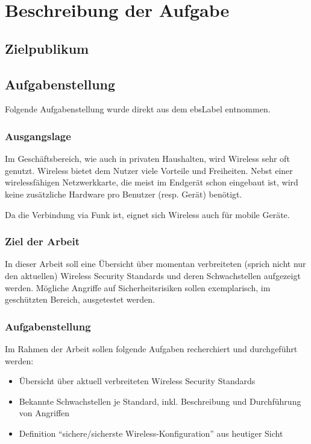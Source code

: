 \chapter{Beschreibung der Aufgabe}

\section{Zielpublikum}

\section{Aufgabenstellung}
Folgende Aufgabenstellung wurde direkt aus dem \gls{ebsLabel} entnommen.

\subsection{Ausgangslage}
Im Geschäftsbereich, wie auch in privaten Haushalten, wird Wireless sehr oft genutzt.
Wireless bietet dem Nutzer viele Vorteile und Freiheiten. Nebst einer wirelessfähigen Netzwerkkarte, die meist im Endgerät schon eingebaut ist, wird keine zusätzliche Hardware pro Benutzer (resp. Gerät) benötigt.

Da die Verbindung via Funk ist, eignet sich Wireless auch für mobile Geräte.

\subsection{Ziel der Arbeit}
In dieser Arbeit soll eine Übersicht über momentan verbreiteten (sprich nicht nur den aktuellen) Wireless Security Standards und deren Schwachstellen aufgezeigt werden.
Mögliche Angriffe auf Sicherheitsrisiken sollen exemplarisch, im geschützten Bereich, ausgetestet werden.

\subsection{Aufgabenstellung}
Im Rahmen der Arbeit sollen folgende Aufgaben recherchiert und durchgeführt werden:
\begin{itemize}
	\item Übersicht über aktuell verbreiteten Wireless Security Standards
	\item Bekannte Schwachstellen je Standard, inkl. Beschreibung und Durchführung von Angriffen
	\item Definition "`sichere/sicherste Wireless-Konfiguration"' aus heutiger Sicht
\end{itemize}

